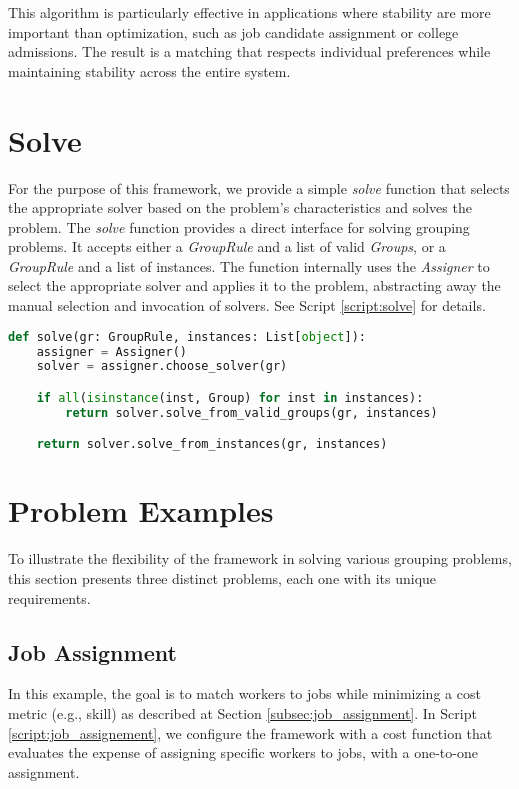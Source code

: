     This algorithm is particularly effective in applications where stability are more important than optimization, such as job candidate assignment or college admissions. The result is a matching that respects individual preferences while maintaining stability across the entire system.

    \section{Solve}
    For the purpose of this framework, we provide a simple \textit{solve} function that selects the appropriate solver based on the problem's characteristics and solves the problem.
    The \textit{solve} function provides a direct interface for solving grouping problems.
    It accepts either a \textit{GroupRule} and a list of valid \textit{Groups}, or a \textit{GroupRule} and a list of instances.
    The function internally uses the \textit{Assigner} to select the appropriate solver and applies it to the problem, abstracting away the manual selection and invocation of solvers.
    See Script \ref{script:solve} for details.

    \begin{lstlisting}[language=Python, caption={Solve.}, label={script:solve}]
def solve(gr: GroupRule, instances: List[object]):
    assigner = Assigner()
    solver = assigner.choose_solver(gr)

    if all(isinstance(inst, Group) for inst in instances):
        return solver.solve_from_valid_groups(gr, instances)

    return solver.solve_from_instances(gr, instances)
\end{lstlisting}

    \section{Problem Examples} \label{sec:examples}
To illustrate the flexibility of the framework in solving various grouping problems, this section presents three distinct problems, each one with its unique requirements.

\subsection{Job Assignment}
In this example, the goal is to match workers to jobs while minimizing a cost metric (e.g., skill) as described at Section \ref{subsec:job_assignment}.
In Script \ref{script:job_assignement}, we configure the framework with a cost function that evaluates the expense of assigning specific workers to jobs, with a one-to-one assignment.

